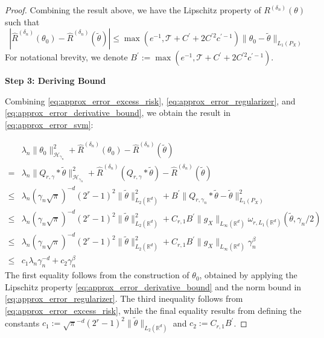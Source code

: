 \begin{proof}
Combining the result above, we have the Lipschitz property of $R^{({\delta_n})}(\theta)$ such that
\begin{equation}\label{eq:approx_error_derivative_bound}
    \left|\widehat R^{({\delta_n})}(\theta_0) -\widehat R^{({\delta_n})}(\tilde\theta)\right|\leq \max(e^{-1},\mathcal{T}+C^\prime + 2C^{\prime2}c^{\prime-1})\|\theta_0 -\tilde\theta \|_{L_1(P_X)}
\end{equation}
For notational brevity, we denote $B^\prime:=\max(e^{-1},\mathcal{T}+C^\prime + 2C^{\prime2}c^{\prime-1})$.

\noindent \textbf{Step 3: Deriving Bound}

\noindent Combining \eqref{eq:approx_error_excess_risk}, \eqref{eq:approx_error_regularizer}, and \eqref{eq:approx_error_derivative_bound}, we obtain the result in \eqref{eq:approx_error_svm}:
 


\begin{align}
&\lambda_n\|\theta_0\|^2_{\mathcal{H}_{\gamma_n}}+\widehat R^{({\delta_n})}(\theta_0) -\widehat R^{({\delta_n})}(\tilde\theta)\nonumber\\
    =& \lambda_n \|Q_{r,\gamma} * \tilde\theta\|^2_{\mathcal{H}_{\gamma_n}} + \widehat R^{({\delta_n})}(Q_{r,\gamma} * \tilde\theta) -\widehat R^{({\delta_n})}(\tilde\theta)\nonumber\\
    \le{}& \lambda_n (\gamma_n\sqrt{\pi})^{-d}(2^r - 1)^2 \|\tilde\theta\|_{L_2(\mathbb{R}^d)}^2 +  B^\prime\|Q_{r,\gamma_n} * \tilde\theta - \tilde\theta\|_{L_1(P_X)}^2 \nonumber\\
    \le{}& \lambda_n (\gamma_n\sqrt{\pi})^{-d}(2^r - 1)^2 \|\tilde\theta\|_{L_2(\mathbb{R}^d)}^2 +  C_{r,1} B^\prime\|g_X\|_{L_\infty(\mathbb{R}^d)} \omega_{r,L_{1}(\mathbb{R}^d)}(\tilde\theta, \gamma_n/2)\nonumber\\
    \le{} & \lambda_n (\gamma_n\sqrt{\pi})^{-d}(2^r - 1)^2 \|\tilde\theta\|_{L_2(\mathbb{R}^d)}^2 +  C_{r,1} B^\prime\|g_X\|_{L_\infty(\mathbb{R}^d)} \gamma_n^\beta\nonumber\\
    \leq & c_1 \lambda_n\gamma_n^{-d} + c_2\gamma_n^{\beta}
\end{align} 
The first equality follows from the construction of $\theta_0$, obtained by applying the Lipschitz property \eqref{eq:approx_error_derivative_bound} and the norm bound in \eqref{eq:approx_error_regularizer}. The third inequality follows from \eqref{eq:approx_error_excess_risk}, while the final equality results from defining the constants $c_1 := \sqrt{\pi}^{-d}(2^r - 1)^2 \|\tilde\theta\|_{L_2(\mathbb{R}^d)}$ and $c_2 := C_{r,1} B^\prime$.



\end{proof}

